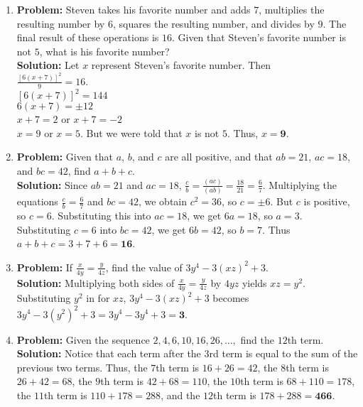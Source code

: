 \documentclass{article}
\begin{document}
\begin{enumerate}
\item \textbf{Problem:} Steven takes his favorite number and adds $7$, multiplies the resulting number by $6$, squares the resulting number, and divides by $9$.  The final result of these operations is $16$.  Given that Steven's favorite number is not $5$, what is his favorite number? \\

\textbf{Solution:} Let $x$ represent Steven's favorite number.  Then \\
$\displaystyle \frac{[6(x+7)]^2}{9} = 16$. \\
$[6(x+7)]^2 = 144$ \\
$6(x+7) = \pm 12$ \\
$x+7 = 2$ or $x + 7 = -2$ \\
$x = 9$ or $x = 5$. But we were told that $x$ is not $5$.  Thus, $x = \mathbf{9}$.


\item \textbf{Problem:} Given that $a$, $b$, and $c$ are all positive, and that $ab = 21$, $ac = 18$, and $bc = 42$, find $a + b + c$. \\

\textbf{Solution:} Since $ab = 21$ and $ac = 18$, $\displaystyle \frac{c}{b} = \frac{(ac)}{(ab)} = \frac{18}{21} = \frac{6}{7}$. Multiplying the equations $\displaystyle \frac{c}{b} = \frac{6}{7}$ and $bc = 42$, we obtain $c^2 = 36$, so $c = \pm 6$.  But $c$ is positive, so $c = 6$.  Substituting this into $ac = 18$, we get $6a = 18$, so $a = 3$.  Substituting $c = 6$ into $bc = 42$, we get $6b = 42$, so $b = 7$.  Thus $a + b + c = 3 + 7 + 6 = \mathbf{16}$.

\item \textbf{Problem:} If $\displaystyle \frac{x}{4y} = \frac{y}{4z}$, find the value of $3y^4 - 3(xz)^2 + 3$.  \\

\textbf{Solution:} Multiplying both sides of $\displaystyle \frac{x}{4y} = \frac{y}{4z}$ by $4yz$ yields
$xz = y^2$. \\

Substituting $y^2$ in for $xz$, $3y^4 - 3(xz)^2 + 3$ becomes \\
$3y^4 - 3(y^2)^2 + 3 = 3y^4 - 3y^4 + 3 = \mathbf{3}$.


\item \textbf{Problem:} Given the sequence $2, 4, 6, 10, 16, 26, \ldots,$ find the $12$th term. \\

\textbf{Solution:} Notice that each term after the $3$rd term is equal to the sum of the previous two terms.  Thus, the $7$th term is $16 + 26 = 42$, the $8$th term is $26 + 42 = 68$, the $9$th term is $42 + 68 = 110$, the $10$th term is $68 + 110 = 178$, the $11$th term is $110 + 178 = 288$, and the $12$th term is $178 + 288 = \mathbf{466}$.



\end{enumerate}
\end{document}
